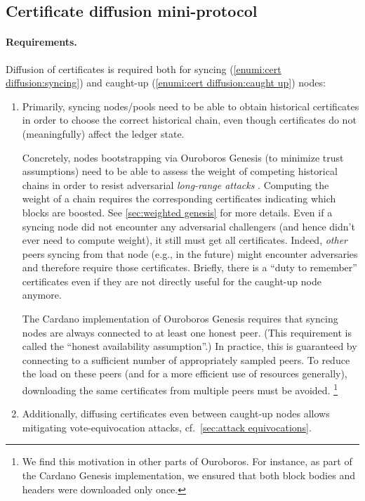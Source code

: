 \subsection{Certificate diffusion mini-protocol}%
\label{sec:certificate-diffusion}

\paragraph{Requirements.}

Diffusion of certificates is required both for syncing (\ref{enumi:cert diffusion:syncing}) and caught-up (\ref{enumi:cert diffusion:caught up}) nodes:

\begin{enumerate}
\item\label{enumi:cert diffusion:syncing}
  Primarily, syncing nodes/pools need to be able to obtain historical certificates in order to choose the correct historical chain, even though certificates do not (meaningfully) affect the ledger state.

  Concretely, nodes bootstrapping via Ouroboros Genesis (to minimize trust assumptions) need to be able to assess the weight of competing historical chains in order to resist adversarial \emph{long-range attacks} \parencite{genesis-implementation-documentation}.
  Computing the weight of a chain requires the corresponding certificates indicating which blocks are boosted.
  See \cref{sec:weighted genesis} for more details.
  Even if a syncing node did not encounter any adversarial challengers (and hence didn't ever need to compute weight), it still must get all certificates. Indeed, \emph{other} peers syncing from that node (e.g., in the future) might encounter adversaries and therefore require those certificates.
  Briefly, there is a \enquote{duty to remember} certificates even if they are not directly useful for the caught-up node anymore.

  The Cardano implementation of Ouroboros Genesis \parencite{genesis-implementation-documentation} requires that syncing nodes are always connected to at least one honest peer.
  (This requirement is called the \enquote{honest availability assumption}.)
  In practice, this is guaranteed by connecting to a sufficient number of appropriately sampled peers.
  To reduce the load on these peers (and for a more efficient use of resources generally), downloading the same certificates from multiple peers must be avoided.%
%
\footnote{We find this motivation in other parts of Ouroboros. For instance, as part of the Cardano Genesis implementation, we ensured that both block bodies and headers were downloaded only once.\cite{genesis-implementation-documentation}}
\item\label{enumi:cert diffusion:caught up}
  Additionally, diffusing certificates even between caught-up nodes allows mitigating vote-equivocation attacks, cf.~\cref{sec:attack equivocations}.
\end{enumerate}

